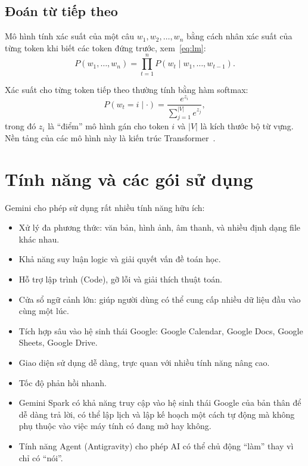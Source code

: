 \documentclass[12pt,a4paper]{article}
\begin{document}
\subsection{Đoán từ tiếp theo}
Mô hình tính xác suất của một câu $w_1, w_2, \dots, w_n$ bằng cách nhân xác suất của từng token khi biết các token đứng trước, xem~\eqref{eq:lm}:
\begin{equation}
  P(w_1,\dots,w_n) = \prod_{t=1}^{n} P(w_t \mid w_1,\dots,w_{t-1}).
  \label{eq:lm}
\end{equation}

Xác suất cho từng token tiếp theo thường tính bằng hàm softmax:
\begin{equation}
  P(w_t = i \mid \cdot) = \frac{e^{z_i}}{\sum_{j=1}^{|V|} e^{z_j}},
  \label{eq:softmax}
\end{equation}
trong đó $z_i$ là ``điểm'' mô hình gán cho token $i$ và $|V|$ là kích thước bộ từ vựng. Nền tảng của các mô hình này là kiến trúc Transformer~\cite{vaswani2017}.

\section{Tính năng và các gói sử dụng}
Gemini cho phép sử dụng rất nhiều tính năng hữu ích:
\begin{itemize}
  \item Xử lý đa phương thức: văn bản, hình ảnh, âm thanh, và nhiều định dạng file khác nhau.
  \item Khả năng suy luận logic và giải quyết vấn đề toán học.
  \item Hỗ trợ lập trình (Code), gỡ lỗi và giải thích thuật toán.
  \item Cửa sổ ngữ cảnh lớn: giúp người dùng có thể cung cấp nhiều dữ liệu đầu vào cùng một lúc.
  \item Tích hợp sâu vào hệ sinh thái Google: Google Calendar, Google Docs, Google Sheets, Google Drive.
  \item Giao diện sử dụng dễ dàng, trực quan với nhiều tính năng nâng cao.
  \item Tốc độ phản hồi nhanh.
  \item Gemini Spark có khả năng truy cập vào hệ sinh thái Google của bản thân để dễ dàng trả lời, có thể lập lịch và lập kế hoạch một cách tự động mà không phụ thuộc vào việc máy tính có đang mở hay không.
  \item Tính năng Agent (Antigravity) cho phép AI có thể chủ động ``làm'' thay vì chỉ có ``nói''.
\end{itemize}
\end{document}
